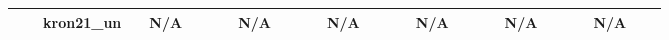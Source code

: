\begin{sidewaystable*}[t!]
\begin{tabular}{|c|c|l|r|r|r|r|r|r|r|r|r|r|r|r|r|l|r|r|r|r|r|r|r|r|r|r|}
\multicolumn{ 1}{|c|}{} &  & kron21\_un & \multicolumn{1}{l|}{} & N/A & \multicolumn{1}{l|}{} &  & \multicolumn{1}{l|}{} & N/A &  &  & \multicolumn{1}{l|}{} & N/A &  & \multicolumn{1}{l|}{} & \multicolumn{1}{l|}{} & N/A &  & \multicolumn{1}{l|}{} & \multicolumn{1}{l|}{} & N/A & \multicolumn{1}{l|}{} & \multicolumn{1}{l|}{} & \multicolumn{1}{l|}{} & N/A & \multicolumn{1}{l|}{} & \multicolumn{1}{l|}{} \\ \hline
\end{tabular}
\label{}
\end{sidewaystable*}